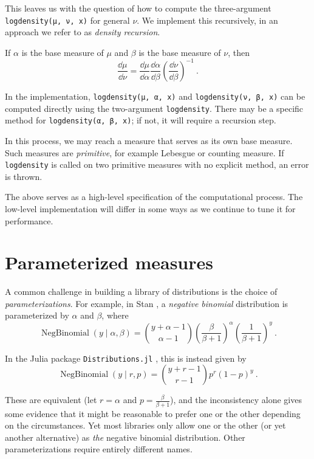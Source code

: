 \documentclass{juliacon}
\begin{document}
This leaves us with the question of how to compute the three-argument \verb|logdensity(μ, ν, x)| for general $\nu$. We implement this recursively, in an approach we refer to as \emph{density recursion}.



If $\alpha$ is the base measure of $\mu$ and $\beta$ is the base measure of $\nu$, then
\[
\frac{\dd \mu}{\dd \nu} =
\frac{\dd \mu}{\dd \alpha}
\frac{\dd \alpha}{\dd \beta}
\left(\frac{\dd \nu}{\dd \beta}\right)^{-1}\ .
\]

In the implementation, \verb|logdensity(μ, α, x)| and \verb|logdensity(ν, β, x)| can be computed directly using the two-argument \verb|logdensity|. There may be a specific method for \verb|logdensity(α, β, x)|; if not, it will require a recursion step.

In this process, we may reach a measure that serves as its own base measure. Such measures are \emph{primitive}, for example Lebesgue or counting measure. If \verb|logdensity| is called on two primitive measures with no explicit method, an error is thrown.

The above serves as a high-level specification  of the computational process. The low-level implementation will differ in some ways as we continue to tune it for performance.


\section{Parameterized measures}

A common challenge in building a library of distributions is the choice of \emph{parameterizations}. For example, in Stan \cite{Stan},
a \emph{negative binomial} distribution is parameterized by $\alpha$ and $\beta$, where
\[
\operatorname{NegBinomial}(y \mid \alpha, \beta)
=\binom{y+\alpha-1}{\alpha-1}\left(\frac{\beta}{\beta+1}\right)^{\alpha}\left(\frac{1}{\beta+1}\right)^{y}\ .
\]

In the Julia package \verb|Distributions.jl| \cite{Distributions.jl-2019}, this is instead given by
\[
\operatorname{NegBinomial}(y \mid r, p)
= \binom{y + r - 1}{r - 1} p^r (1 - p)^y \ .
\]

These are equivalent (let $r = \alpha$ and $p = \frac{\beta}{\beta + 1}$), and the inconsistency alone gives some evidence that it might be reasonable to prefer one or the other depending on the circumstances. Yet most libraries only allow one or the other (or yet another alternative) as \emph{the} negative binomial distribution. Other parameterizations require entirely different names.
\end{document}
